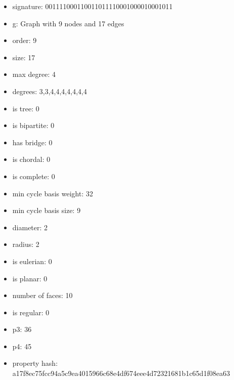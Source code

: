 \newpage
\begin{figure}
\end{figure}
\begin{itemize}
\item signature: 001111000110011011110001000010001011
\item g: Graph with 9 nodes and 17 edges
\item order: 9
\item size: 17
\item max degree: 4
\item degrees: 3,3,4,4,4,4,4,4,4
\item is tree: 0
\item is bipartite: 0
\item has bridge: 0
\item is chordal: 0
\item is complete: 0
\item min cycle basis weight: 32
\item min cycle basis size: 9
\item diameter: 2
\item radius: 2
\item is eulerian: 0
\item is planar: 0
\item number of faces: 10
\item is regular: 0
\item p3: 36
\item p4: 45
\item property hash: a17f8ec75fcc94a5c9ea4015966c68e4df674eee4d72321681b1c65d1f08ea63
\end{itemize}
